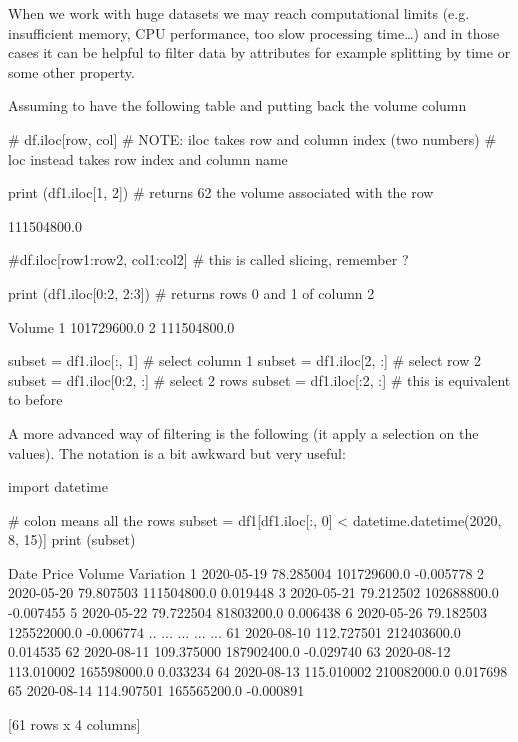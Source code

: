 When we work with huge datasets we may reach computational limits (e.g. insufficient memory, CPU performance, too slow processing time\ldots) and in those cases it can be helpful to filter data by attributes for example splitting by time or some other property.

Assuming to have the following table and putting back the volume column

\begin{ipython}
# df.iloc[row, col]
# NOTE: iloc takes row and column index (two numbers)
# loc instead takes row index and column name

print (df1.iloc[1, 2]) # returns 62 the volume associated with the row
\end{ipython}
\begin{ioutput}
111504800.0
\end{ioutput}

\begin{ipython}
#df.iloc[row1:row2, col1:col2]
# this is called slicing, remember ?

print (df1.iloc[0:2, 2:3]) # returns rows 0 and 1 of column 2
\end{ipython}
\begin{ioutput}
        Volume
1  101729600.0
2  111504800.0
\end{ioutput}

\begin{ipython}
subset = df1.iloc[:, 1] # select column 1
subset = df1.iloc[2, :] # select row 2
subset = df1.iloc[0:2, :] # select 2 rows
subset = df1.iloc[:2, :] # this is equivalent to before
\end{ipython}

A more advanced way of filtering is the following (it apply a selection on the values). The notation is a bit awkward but very useful:

\begin{ipython}
import datetime

# colon means all the rows
subset = df1[df1.iloc[:, 0] < datetime.datetime(2020, 8, 15)]
print (subset)
\end{ipython}
\begin{ioutput}
         Date       Price       Volume  Variation
1  2020-05-19   78.285004  101729600.0  -0.005778
2  2020-05-20   79.807503  111504800.0   0.019448
3  2020-05-21   79.212502  102688800.0  -0.007455
5  2020-05-22   79.722504   81803200.0   0.006438
6  2020-05-26   79.182503  125522000.0  -0.006774
..        ...         ...          ...        ...
61 2020-08-10  112.727501  212403600.0   0.014535
62 2020-08-11  109.375000  187902400.0  -0.029740
63 2020-08-12  113.010002  165598000.0   0.033234
64 2020-08-13  115.010002  210082000.0   0.017698
65 2020-08-14  114.907501  165565200.0  -0.000891

[61 rows x 4 columns]
\end{ioutput}

